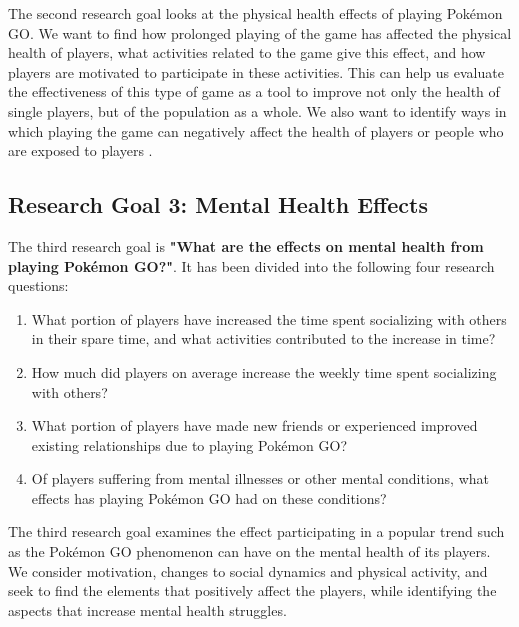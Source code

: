 The second research goal looks at the physical health effects of playing Pokémon GO. We want to find how prolonged playing of the game has affected the physical health of players, what activities related to the game give this effect, and how players are motivated to participate in these activities. This can help us evaluate the effectiveness of this type of game as a tool to improve not only the health of single players, but of the population as a whole. We also want to identify ways in which playing the game can negatively affect the health of players or people who are exposed to players .

\subsection{Research Goal 3: Mental Health Effects}
\label{rg3}

The third research goal is \textbf{"What are the effects on mental health from playing Pokémon GO?"}. It has been divided into the following four research questions:

\begin{enumerate}
	\item What portion of players have increased the time spent socializing with others in their spare time, and what activities contributed to the increase in time?
	\item How much did players on average increase the weekly time spent socializing with others?
	\item What portion of players have made new friends or experienced improved existing relationships due to playing Pokémon GO?
	\item Of players suffering from mental illnesses or other mental conditions, what effects has playing Pokémon GO had on these conditions?
\end{enumerate}

The third research goal examines the effect participating in a popular trend such as the Pokémon GO phenomenon can have on the mental health of its players. We consider motivation, changes to social dynamics and physical activity, and seek to find the elements that positively affect the players, while identifying the aspects that increase mental health struggles.